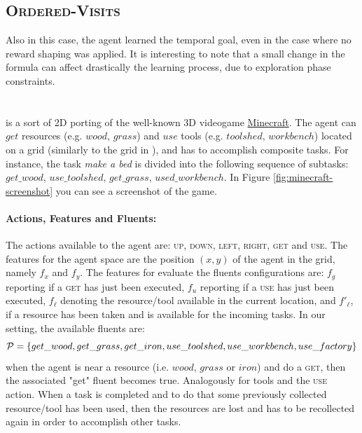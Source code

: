 \subsection{\textsc{Ordered-Visits}}
Also in this case, the agent learned the temporal goal, even in the case where no reward shaping was applied. It is interesting to note that a small change in the formula can affect drastically the learning process, due to exploration phase constraints.

\section{\Minecraft}
\Minecraft \citep{pmlr-v70-andreas17a} is a sort of 2D porting of the well-known 3D videogame \href{https://minecraft.net/en-us/}{Minecraft}. 
The agent can $get$ resources (e.g. $wood$, $grass$) and $use$ tools (e.g. $toolshed$, $workbench$) located on a grid (similarly to the grid in \Sapientino), and has to accomplish composite tasks. For instance, the task \emph{make a bed} is divided into the following sequence of subtasks: $get\_wood$, $use\_toolshed$, $get\_grass$, $used\_workbench$. In Figure \ref{fig:minecraft-screenshot} you can see a screenshot of the game.

\paragraph{Actions, Features and Fluents:}  The actions available to the agent are: \textsc{up, down, left, right}, \textsc{get} and \textsc{use}. The features for the agent space are the position $(x,y)$ of the agent in the grid, namely $f_x$ and $f_y$. The features for evaluate the fluents configurations are: $f_g$ reporting if a \textsc{get} has just been executed,  $f_u$ reporting if a \textsc{use} has just been executed, $f_\ell$ denoting the resource/tool available in the current location, and $f'_\ell$, if a resource has been taken and is available for the incoming tasks. In our setting, the available fluents are: $$\mathcal{P} = \{get\_wood, get\_grass, get\_iron, use\_toolshed,use\_workbench, use\_factory\}$$ 
when the agent is near a resource (i.e. $wood$, $grass$ or $iron$) and do a \textsc{get}, then the associated "get" fluent becomes true. Analogously for tools and the \textsc{use} action. When a task is completed and to do that some previously collected resource/tool has been used, then the resources are lost and has to be recollected again in order to accomplish other tasks.

